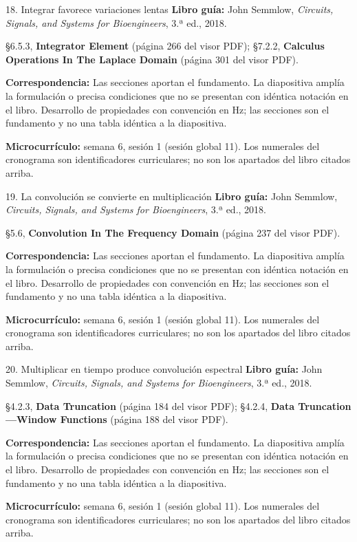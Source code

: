 \documentclass[
  10pt,
  ignorenonframetext,
  aspectratio=169,
  spanish,
]{beamer}
\begin{document}
\begin{frame}{18. Integrar favorece variaciones lentas}
\label{integrar-favorece-variaciones-lentas}
\textbf{Libro guía:} John Semmlow, \emph{Circuits, Signals, and Systems
for Bioengineers}, 3.ª ed., 2018.

§6.5.3, \textbf{Integrator Element} (página 266 del visor PDF); §7.2.2,
\textbf{Calculus Operations In The Laplace Domain} (página 301 del visor
PDF).

\textbf{Correspondencia:} Las secciones aportan el fundamento. La
diapositiva amplía la formulación o precisa condiciones que no se
presentan con idéntica notación en el libro. Desarrollo de propiedades
con convención en Hz; las secciones son el fundamento y no una tabla
idéntica a la diapositiva.

\textbf{Microcurrículo:} semana 6, sesión 1 (sesión global 11). Los
numerales del cronograma son identificadores curriculares; no son los
apartados del libro citados arriba.
\end{frame}

\begin{frame}{19. La convolución se convierte en multiplicación}
\label{la-convoluciuxf3n-se-convierte-en-multiplicaciuxf3n}
\textbf{Libro guía:} John Semmlow, \emph{Circuits, Signals, and Systems
for Bioengineers}, 3.ª ed., 2018.

§5.6, \textbf{Convolution In The Frequency Domain} (página 237 del visor
PDF).

\textbf{Correspondencia:} Las secciones aportan el fundamento. La
diapositiva amplía la formulación o precisa condiciones que no se
presentan con idéntica notación en el libro. Desarrollo de propiedades
con convención en Hz; las secciones son el fundamento y no una tabla
idéntica a la diapositiva.

\textbf{Microcurrículo:} semana 6, sesión 1 (sesión global 11). Los
numerales del cronograma son identificadores curriculares; no son los
apartados del libro citados arriba.
\end{frame}

\begin{frame}{20. Multiplicar en tiempo produce convolución espectral}
\label{multiplicar-en-tiempo-produce-convoluciuxf3n-espectral}
\textbf{Libro guía:} John Semmlow, \emph{Circuits, Signals, and Systems
for Bioengineers}, 3.ª ed., 2018.

§4.2.3, \textbf{Data Truncation} (página 184 del visor PDF); §4.2.4,
\textbf{Data Truncation---Window Functions} (página 188 del visor PDF).

\textbf{Correspondencia:} Las secciones aportan el fundamento. La
diapositiva amplía la formulación o precisa condiciones que no se
presentan con idéntica notación en el libro. Desarrollo de propiedades
con convención en Hz; las secciones son el fundamento y no una tabla
idéntica a la diapositiva.

\textbf{Microcurrículo:} semana 6, sesión 1 (sesión global 11). Los
numerales del cronograma son identificadores curriculares; no son los
apartados del libro citados arriba.
\end{frame}
\end{document}
